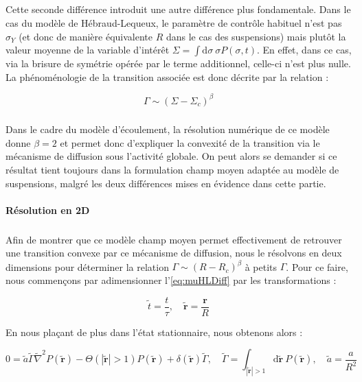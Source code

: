 \subparagraph{}Cette seconde différence introduit une autre différence plus fondamentale. Dans le cas du modèle de Hébraud-Lequeux, le paramètre de contrôle habituel n'est pas $\sigma_Y$ (et donc de manière équivalente $R$ dans le cas des suspensions) mais plutôt la valeur moyenne de la variable d'intérêt $\Sigma = \int \mathrm{d}\sigma~\sigma P(\sigma,t)$. En effet, dans ce cas, via la brisure de symétrie opérée par le terme additionnel, celle-ci n'est plus nulle. La phénoménologie de la transition associée est donc décrite par la relation :

\begin{equation}
	\Gamma \sim (\Sigma - \Sigma_c)^\beta
	\label{eq:paramordre_HL}
\end{equation}

\subparagraph{}Dans le cadre du modèle d'écoulement, la résolution numérique de ce modèle donne $\beta=2$ et permet donc d'expliquer la convexité de la transition via le mécanisme de diffusion sous l'activité globale. On peut alors se demander si ce résultat tient toujours dans la formulation champ moyen adaptée au modèle de suspensions, malgré les deux différences mises en évidence dans cette partie.

\paragraph{Résolution en 2D}

\subparagraph{}Afin de montrer que ce modèle champ moyen permet effectivement de retrouver une transition convexe par ce mécanisme de diffusion, nous le résolvons en deux dimensions pour déterminer la relation $\Gamma \sim (R - R_c)^\beta$ à petits $\Gamma$. Pour ce faire, nous commençons par adimensionner l'\autoref{eq:muHLDiff} par les transformations :

\begin{equation}
	\tilde{t} = \frac{t}{\tau}, \quad \tilde{\mathbf{r}} = \frac{\mathbf{r}}{R}
\end{equation}

\noindent En nous plaçant de plus dans l'état stationnaire, nous obtenons alors :

\begin{equation}
    0 = \tilde{a}\tilde{\Gamma}\tilde{\nabla}^2 P(\tilde{\mathbf{r}}) - \Theta(|\tilde{\mathbf{r}}|>1)P(\tilde{\mathbf{r}}) + \delta(\tilde{\mathbf{r}})\tilde{\Gamma}, \quad \tilde{\Gamma} = \int_{|\tilde{\mathbf{r}}|>1}\mathrm{d}\tilde{\mathbf{r}}~P(\tilde{\mathbf{r}}),\quad \tilde{a} = \frac{a}{R^2}
\end{equation} 

